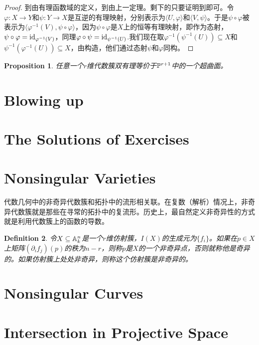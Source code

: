 \documentclass[9pt]{extbook}
\theoremstyle{plain}%
\newtheorem{defi}{Definition}[section]%
\newtheorem{pro}[defi]{Proposition}%
\begin{document}
\begin{proof}
	到由有理函数域的定义，到由上一定理。剩下的只要证明到即可。令$\varphi:X\to Y$和$\psi:Y\to X$是互逆的有理映射，分别表示为$\langle U,\varphi \rangle$和$\langle V,\psi \rangle$。于是$\psi\circ\varphi$被表示为$\langle \varphi^{-1}(V),\psi\circ\varphi \rangle$，因为$\psi\circ\varphi$是$X$上的恒等有理映射，即作为态射，$\psi\circ\varphi=\operatorname{id}_{\varphi^{-1}(V)}$，同理$\varphi\circ\psi=\operatorname{id}_{\psi^{-1}(U)}$.我们现在取$\varphi^{-1}(\psi^{-1}(U))\subseteq X$和$\psi^{-1}(\varphi^{-1}(U))\subseteq X$，由构造，他们通过态射$\psi$和$\varphi$同构。
\end{proof}
\begin{pro}
	任意一个$r$维代数簇双有理等价于$\mathbb{P}^{r+1}$中的一个超曲面。
\end{pro}
\section*{Blowing up}
\section*{The Solutions of Exercises}
\section{Nonsingular Varieties}
代数几何中的非奇异代数簇和拓扑中的流形相关联。在复数（解析）情况上，非奇异代数簇就是那些在寻常的拓扑中的复流形。历史上，最自然定义非奇异性的方式就是利用代数簇上的函数的导数。
\begin{defi}
	令$X\subseteq \mathbb{A}^n_k$是一个$r$维仿射簇，$I(X)$的生成元为$\{f_i\}$。如果在$p\in X$上矩阵$(\partial_i f_j)(p)$的秩为$n-r$，则称$p$是$X$的一个非奇异点，否则就称他是奇异的。如果仿射簇上处处非奇异，则称这个仿射簇是非奇异的。
\end{defi}
\section{Nonsingular Curves}

\section{Intersection in Projective Space}
\end{document}
